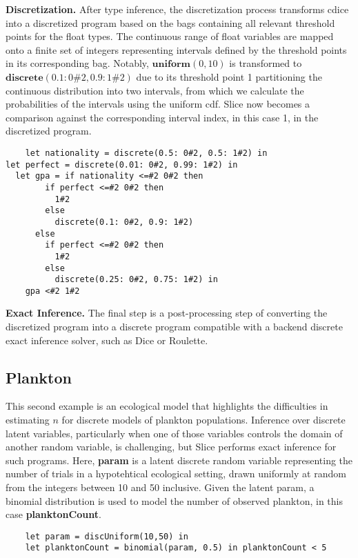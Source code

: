 \documentclass[acmsmall,screen,dvipsnames,x11names,nonacm,anonymous,review]{acmart}
\begin{document}
\textbf{Discretization.} After type inference, the discretization process transforms cdice into a discretized program based on the bags containing all relevant threshold points for the float types. The continuous range of float variables are mapped onto a finite set of integers representing intervals defined by the threshold points in its corresponding bag. Notably, $\textbf{uniform}(0,10)$ is transformed to $\textbf{discrete}(0.1: 0\#2, 0.9: 1\#2)$ due to its threshold point 1 partitioning the continuous distribution into two intervals, from which we calculate the probabilities of the intervals using the uniform cdf. Slice now becomes a comparison against the corresponding interval index, in this case 1, in the discretized program.

\begin{lstlisting}
    let nationality = discrete(0.5: 0#2, 0.5: 1#2) in
let perfect = discrete(0.01: 0#2, 0.99: 1#2) in
  let gpa = if nationality <=#2 0#2 then
        if perfect <=#2 0#2 then
          1#2
        else
          discrete(0.1: 0#2, 0.9: 1#2)
      else
        if perfect <=#2 0#2 then
          1#2
        else
          discrete(0.25: 0#2, 0.75: 1#2) in
    gpa <#2 1#2
\end{lstlisting}


\textbf{Exact Inference.} The final step is a post-processing step of converting the discretized program into a discrete program compatible with a backend discrete exact inference solver, such as Dice or Roulette.

\subsection{Plankton}
This second example is an ecological model that highlights the difficulties in estimating $n$ for discrete models of plankton populations. Inference over discrete latent variables, particularly when one of those variables controls the domain of another random variable, is challenging, but Slice performs exact inference for such programs. Here, \textbf{param} is a latent discrete random variable representing the number of trials in a hypotehtical ecological setting, drawn uniformly at random from the integers between 10 and 50 inclusive. Given the latent param, a binomial distribution is used to model the number of observed plankton, in this case \textbf{planktonCount}.

\begin{lstlisting}
    let param = discUniform(10,50) in
    let planktonCount = binomial(param, 0.5) in planktonCount < 5
\end{lstlisting}
\end{document}
